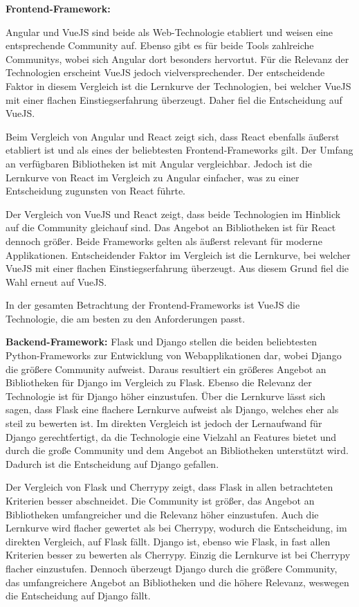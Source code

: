 \textbf{Frontend-Framework:}

Angular und VueJS sind beide als Web-Technologie etabliert und weisen eine entsprechende Community auf.
Ebenso gibt es für beide Tools zahlreiche Communitys, wobei sich Angular dort besonders hervortut.
Für die Relevanz der Technologien erscheint VueJS jedoch vielversprechender.
Der entscheidende Faktor in diesem Vergleich ist die Lernkurve der Technologien, bei welcher VueJS mit einer flachen Einstiegserfahrung überzeugt.
Daher fiel die Entscheidung auf VueJS.

Beim Vergleich von Angular und React zeigt sich, dass React ebenfalls äußerst etabliert ist und als eines der beliebtesten Frontend-Frameworks gilt.
Der Umfang an verfügbaren Bibliotheken ist mit Angular vergleichbar.
Jedoch ist die Lernkurve von React im Vergleich zu Angular einfacher, was zu einer Entscheidung zugunsten von React führte.

Der Vergleich von VueJS und React zeigt, dass beide Technologien im Hinblick auf die Community gleichauf sind.
Das Angebot an Bibliotheken ist für React dennoch größer.
Beide Frameworks gelten als äußerst relevant für moderne Applikationen.
Entscheidender Faktor im Vergleich ist die Lernkurve, bei welcher VueJS mit einer flachen Einstiegserfahrung überzeugt.
Aus diesem Grund fiel die Wahl erneut auf VueJS.

In der gesamten Betrachtung der Frontend-Frameworks ist VueJS die Technologie, die am besten zu den Anforderungen passt.

\textbf{Backend-Framework:}
Flask und Django stellen die beiden beliebtesten Python-Frameworks zur Entwicklung von Webapplikationen dar, wobei Django die größere Community aufweist.
Daraus resultiert ein größeres Angebot an Bibliotheken für Django im Vergleich zu Flask.
Ebenso die Relevanz der Technologie ist für Django höher einzustufen.
Über die Lernkurve lässt sich sagen, dass Flask eine flachere Lernkurve aufweist als Django, welches eher als steil zu bewerten ist.
Im direkten Vergleich ist jedoch der Lernaufwand für Django gerechtfertigt, da die Technologie eine Vielzahl an Features bietet und durch die große Community und dem Angebot an Bibliotheken unterstützt wird.
Dadurch ist die Entscheidung auf Django gefallen.

Der Vergleich von Flask und Cherrypy zeigt, dass Flask in allen betrachteten Kriterien besser abschneidet.
Die Community ist größer, das Angebot an Bibliotheken umfangreicher und die Relevanz höher einzustufen.
Auch die Lernkurve wird flacher gewertet als bei Cherrypy, wodurch die Entscheidung, im direkten Vergleich, auf Flask fällt.
Django ist, ebenso wie Flask, in fast allen Kriterien besser zu bewerten als Cherrypy.
Einzig die Lernkurve ist bei Cherrypy flacher einzustufen.
Dennoch überzeugt Django durch die größere Community, das umfangreichere Angebot an Bibliotheken und die höhere Relevanz, weswegen die Entscheidung auf Django fällt.

